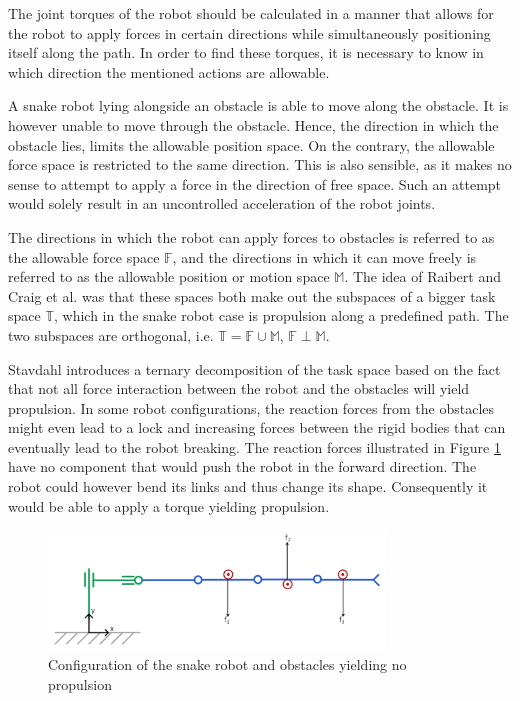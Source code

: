 The joint torques of the robot should be calculated in a manner that allows for the robot to apply forces in certain directions while simultaneously positioning itself along the path. In order to find these torques, it is necessary to know in which direction the mentioned actions are allowable.

A snake robot lying alongside an obstacle is able to move along the obstacle. It is however unable to move through the obstacle. Hence, the direction in which the obstacle lies, limits the allowable position space. On the contrary, the allowable force space is restricted to the same direction. 
This is also sensible, as it makes no sense to attempt to apply a force in the direction of free space. Such an attempt would solely result in an uncontrolled acceleration of the robot joints.

The directions in which the robot can apply forces to obstacles is referred to as the allowable force space $\mathbb{F}$, and the directions in which it can move freely is referred to as the allowable position or motion space $\mathbb{M}$. The idea of Raibert and Craig et al. \cite{raibert1981hybrid} was that these spaces both make out the subspaces of a bigger task space $\mathbb{T}$, which in the snake robot case is propulsion along a predefined path. The two subspaces are orthogonal, i.e. $\mathbb{T}=\mathbb{F}\cup\mathbb{M}$, $\mathbb{F}\perp\mathbb{M}$.

Stavdahl \cite{StavdahlNote} introduces a ternary decomposition of the task space based on the fact that not all force interaction between the robot and the obstacles will yield propulsion. In some robot configurations, the reaction forces from the obstacles might even lead to a lock and increasing forces between the rigid bodies that can eventually lead to the robot breaking. The reaction forces illustrated in Figure \ref{fig:noprop} have no component that would push the robot in the forward direction. The robot could however bend its links and thus change its shape. Consequently it would be able to apply a torque yielding propulsion.

\begin{figure}[h!]
    \centering
    \includegraphics[width=0.8\textwidth]{figures/no_propulsion.PNG}
    \caption{Configuration of the snake robot and obstacles yielding no propulsion}
    \label{fig:noprop}
\end{figure}

